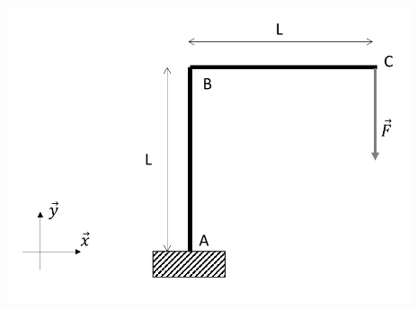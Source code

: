 \documentclass[lecture.tex]{subfiles}
\begin{document}
\exercice{}


\begin{center}
  \includegraphics[scale=0.6]{exo-portique-efforts.png}
\end{center}
\end{document}
